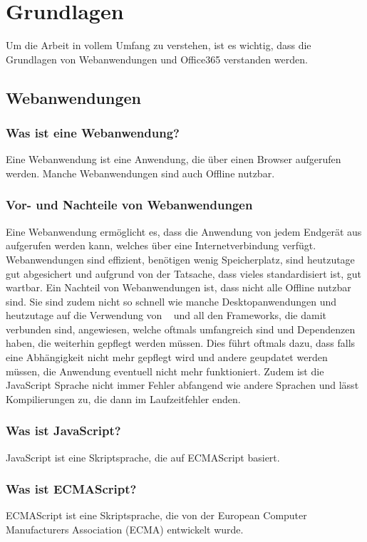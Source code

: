 
\section{Grundlagen}\label{sec:grundlagen}
Um die Arbeit in vollem Umfang zu verstehen, ist es wichtig, dass die Grundlagen von Webanwendungen und Office365 verstanden werden.
\subsection{Webanwendungen}\label{subsec:webanwendungen}

\subsubsection{Was ist eine Webanwendung?}
Eine Webanwendung ist eine Anwendung, die über einen Browser aufgerufen werden.
Manche Webanwendungen sind auch Offline nutzbar.
\subsubsection{Vor- und Nachteile von Webanwendungen}
Eine Webanwendung ermöglicht es, dass die Anwendung von jedem Endgerät aus aufgerufen werden kann, welches über eine Internetverbindung verfügt.
Webanwendungen sind effizient, benötigen wenig Speicherplatz, sind heutzutage gut abgesichert und aufgrund von der Tatsache, dass vieles standardisiert ist, gut wartbar.
\newline
\newline
Ein Nachteil von Webanwendungen ist, dass nicht alle Offline nutzbar sind.
Sie sind zudem nicht so schnell wie manche Desktopanwendungen und heutzutage auf die Verwendung von ~\cite{JavaScript} und all den Frameworks, die damit verbunden sind, angewiesen, welche oftmals umfangreich sind und Dependenzen haben, die weiterhin gepflegt werden müssen.
Dies führt oftmals dazu, dass falls eine Abhängigkeit nicht mehr gepflegt wird und andere geupdatet werden müssen, die Anwendung eventuell nicht mehr funktioniert.
Zudem ist die JavaScript Sprache nicht immer Fehler abfangend wie andere Sprachen und lässt Kompilierungen zu, die dann im Laufzeitfehler enden.
\subsubsection{Was ist JavaScript?}
JavaScript ist eine Skriptsprache, die auf ECMAScript basiert.
\subsubsection{Was ist ECMAScript?}
ECMAScript ist eine Skriptsprache, die von der European Computer Manufacturers Association (ECMA) entwickelt wurde.
